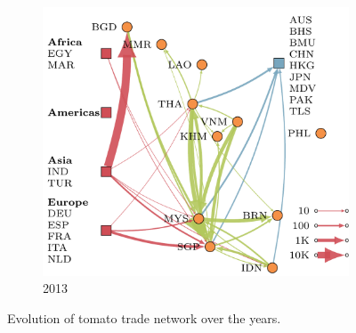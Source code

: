\documentclass[10pt]{article}
\newcommand{\mooreRange}{r_\mathrm{M}}
\theoremstyle{definition}
\begin{document}
\begin{figure}[!ht]
\begin{subfigure}[b]{.32\textwidth}
\end{subfigure}
\begin{subfigure}[b]{.32\textwidth}
    \includegraphics[width=\textwidth]{../international_trade/results/network_plots/sea_2013_tomato.pdf}
    \caption{2013}
\end{subfigure}
\caption{Evolution of tomato trade network over the years.}
\label{fig:tradeYears}
\end{figure}
\end{document}
